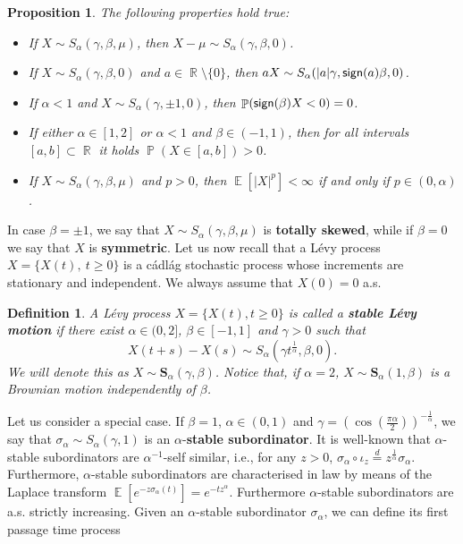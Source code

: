\documentclass[]{amsart}
\numberwithin{equation}{section}
\newtheorem{defn}{Definition}[section]
\newtheorem{prop}[thm]{Proposition}
\theoremstyle{remark}
\theoremstyle{definition}
\DeclareMathOperator{\E}{\mathbb{E}}
\DeclareMathOperator{\R}{\mathbb{R}}
\DeclareMathOperator{\bP}{\mathbb{P}}
\begin{document}
\begin{prop}
	The following properties hold true:
	\begin{itemize}
		\item If $X \sim S_\alpha(\gamma,\beta,\mu)$, then $X-\mu \sim S_\alpha(\gamma,\beta,0)$. 
		\item If $X \sim S_\alpha(\gamma,\beta,0)$ and $a \in \R \setminus \{0\}$, then $aX \sim S_\alpha(|a|\gamma,{\sf sign}(a)\beta,0)$.
		\item If $\alpha<1$ and $X \sim S_\alpha(\gamma,\pm 1, 0)$, then $\bP({\sf sign}(\beta)X<0)=0$.
		\item If either $\alpha \in [1,2]$ or $\alpha<1$ and $\beta \in (-1,1)$, then for all intervals $[a,b] \subset \R$ it holds $\bP(X \in [a,b])>0$.
		\item If $X \sim S_\alpha(\gamma,\beta,\mu)$ and $p>0$, then $\E[|X|^p]<\infty$ if and only if $p \in (0,\alpha)$.
	\end{itemize}
\end{prop}
In case $\beta=\pm 1$, we say that $X \sim S_\alpha(\gamma,\beta,\mu)$ is \textbf{totally skewed}, while if $\beta=0$ we say that $X$ is \textbf{symmetric}. Let us now recall that a L\'evy process $X=\{X(t), \ t \ge 0\}$ is a c\'adl\'ag stochastic process whose increments are stationary and independent. We always assume that $X(0)=0$ a.s. 
\begin{defn}
	A L\'evy process $X=\{X(t), t \ge 0\}$ is called a \textbf{stable L\'evy motion} if there exist $\alpha \in (0,2]$, $\beta \in [-1,1]$ and $\gamma>0$ such that
	\begin{equation*}
		X(t+s)-X(s)\sim S_\alpha(\gamma t^{\frac{1}{\alpha}},\beta,0).
	\end{equation*}
	We will denote this as $X \sim \mathbf{S}_\alpha(\gamma,\beta)$. Notice that, if $\alpha=2$, $X \sim \mathbf{S}_\alpha(1,\beta)$ is a Brownian motion independently of $\beta$.
\end{defn}
Let us consider a special case. If $\beta=1$, $\alpha \in (0,1)$ and $\gamma=\left(\cos\left(\frac{\pi \alpha}{2}\right)\right)^{-\frac{1}{\alpha}}$, we say that $\sigma_\alpha \sim S_\alpha(\gamma,1)$ is an $\alpha$-\textbf{stable subordinator}. It is well-known that $\alpha$-stable subordinators are $\alpha^{-1}$-self similar, i.e., for any $z>0$, $\sigma_\alpha \circ \iota_z \overset{d}{=}z^{\frac{1}{\alpha}}\sigma_\alpha$. Furthermore, $\alpha$-stable subordinators are characterised in law by means of the Laplace transform $\E[e^{-z\sigma_\alpha(t)}]=e^{-tz^\alpha}$. Furthermore $\alpha$-stable subordinators are a.s. strictly increasing. Given an $\alpha$-stable subordinator $\sigma_\alpha$, we can define its first passage time process
\end{document}
